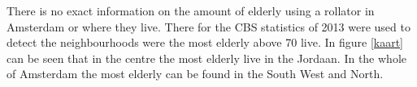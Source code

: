 There is no exact information on the amount of elderly using a rollator in Amsterdam or where they live. There for the CBS statistics of 2013 were used to detect the neighbourhoods were the most elderly above 70 live. In figure \ref{kaart} can be seen that in the centre the most elderly live in the Jordaan. In the whole of Amsterdam the most elderly can be found in the South West and North. 